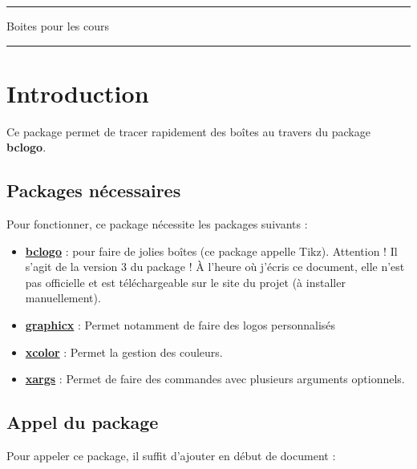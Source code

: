 \documentclass[a4paper,12pt]{article}
\begin{document}
	\begin{center}
		\hrule{\Large Boites pour les cours}\\\hrule
	\end{center}

	\tableofcontents
	\newcommand{\sectionbreak}{\newpage}


\newenvironment{ttt}{\begin{center}}{\end{center}}




	\section{Introduction}

		Ce package permet de tracer rapidement des boîtes au travers du package \textbf{bclogo}.

		\subsection{Packages nécessaires}

		Pour fonctionner, ce package nécessite les packages suivants :
		\begin{itemize}
			\item \href{http://melusine.eu.org/syracuse/G/bclogo/dev/latex/}{\textbf{bclogo}} : pour faire de jolies boîtes (ce package appelle Tikz). Attention ! Il s'agit de la version 3 du package ! À l'heure où j'écris ce document, elle n'est pas officielle et est téléchargeable sur le site du projet (à installer manuellement).
			\item \href{http://ctan.org/pkg/graphicx}{\textbf{graphicx}} : Permet notamment de faire des logos personnalisés
			\item \href{http://www.ctan.org/tex-archive/macros/latex/contrib/xcolor}{\textbf{xcolor}} : Permet la gestion des couleurs.
			\item \href{http://www.ctan.org/tex-archive/macros/latex/contrib/xargs}{\textbf{xargs}} : Permet de faire des commandes avec plusieurs arguments optionnels.
		\end{itemize}

		\subsection{Appel du package}

		Pour appeler ce package, il suffit d'ajouter en début de document :
\end{document}

